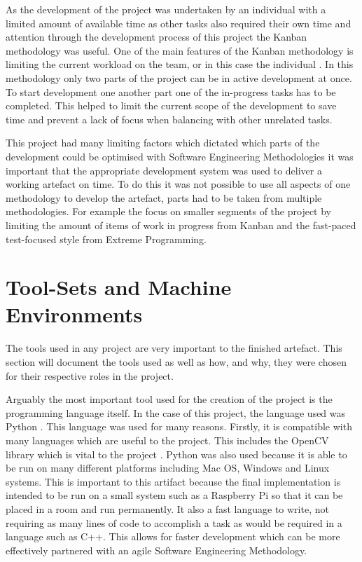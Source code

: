 \documentclass[11pt,a4paper]{report}
\begin{document}
As the development of the project was undertaken by an individual with a limited amount of available time as other tasks also required their own time and attention through the development process of this project the Kanban methodology was useful. One of the main features of the Kanban methodology is limiting the current workload on the team, or in this case the individual \citep{Kanban_lei2017statistical}. In this methodology only two parts of the project can be in active development at once. To start development one another part one of the in-progress tasks has to be completed. This helped to limit the current scope of the development to save time and prevent a lack of focus when balancing with other unrelated tasks.

This project had many limiting factors which dictated which parts of the development could be optimised with Software Engineering Methodologies it was important that the appropriate development system was used to deliver a working artefact on time. To do this it was not possible to use all aspects of one methodology to develop the artefact, parts had to be taken from multiple methodologies. For example the focus on smaller segments of the project by limiting the amount of items of work in progress from Kanban and the fast-paced test-focused style from Extreme Programming.

\section{Tool-Sets and Machine Environments}

The tools used in any project are very important to the finished artefact. This section will document the tools used as well as how, and why, they were chosen for their respective roles in the project.

Arguably the most important tool used for the creation of the project is the programming language itself. In the case of this project, the language used was Python \citep{Python}. This language was used for many reasons. Firstly, it is compatible with many languages which are useful to the project. This includes the OpenCV library which is vital to the project \citep{OpenCV}. Python was also used because it is able to be run on many different platforms including Mac OS, Windows and Linux systems. This is important to this artifact because the final implementation is intended to be run on a small system such as a Raspberry Pi so that it can be placed in a room and run permanently. It also a fast language to write, not requiring as many lines of code to accomplish a task as would be required in a language such as C++. This allows for faster development which can be more effectively partnered with an agile Software Engineering Methodology.    
\end{document}
